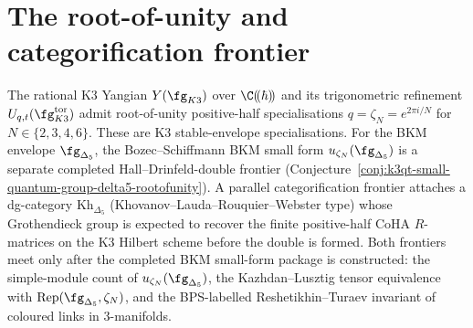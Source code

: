 \section{The root-of-unity and categorification frontier}
\label{sec:root-of-unity-categorification-frontier}

The rational K3 Yangian $Y(\fg_{K3})$ over $\C(\!(\hbar)\!)$ and its
trigonometric refinement $U_{q,t}(\fg_{K3}^{\mathrm{tor}})$ admit
root-of-unity positive-half specialisations
$q=\zeta_N=e^{2\pi i/N}$ for $N\in\{2,3,4,6\}$. These are K3
stable-envelope specialisations. For the BKM envelope
$\fg_{\Delta_5}$, the Bozec--Schiffmann BKM small form
$u_{\zeta_N}(\fg_{\Delta_5})$ is a separate completed
Hall--Drinfeld-double frontier (Conjecture~\ref{conj:k3qt-small-quantum-group-delta5-rootofunity}).
A parallel categorification frontier attaches a dg-category
$\mathrm{Kh}_{\Delta_5}$ (Khovanov--Lauda--Rouquier--Webster type)
whose Grothendieck group is expected to recover the finite positive-half
CoHA $R$-matrices on the K3 Hilbert scheme before the double is formed.
Both frontiers meet only after the completed BKM small-form package is
constructed: the simple-module count of $u_{\zeta_N}(\fg_{\Delta_5})$,
the Kazhdan--Lusztig tensor equivalence with
$\mathrm{Rep}(\fg_{\Delta_5},\zeta_N)$, and the BPS-labelled
Reshetikhin--Turaev invariant of coloured links in $3$-manifolds.

